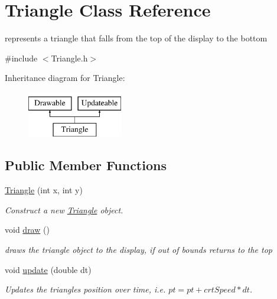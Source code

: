 \hypertarget{class_triangle}{}\section{Triangle Class Reference}
\label{class_triangle}


represents a triangle that falls from the top of the display to the bottom  




{\ttfamily \#include $<$Triangle.\+h$>$}

Inheritance diagram for Triangle\+:\begin{figure}[H]
\begin{center}
\leavevmode
\includegraphics[height=2.000000cm]{class_triangle}
\end{center}
\end{figure}
\subsection*{Public Member Functions}
\begin{DoxyCompactItemize}
\item 
\mbox{\hyperlink{class_triangle_afc6e6f7865d0dda26dd77682b2e29eeb}{Triangle}} (int x, int y)
\begin{DoxyCompactList}\small\item\em Construct a new \mbox{\hyperlink{class_triangle}{Triangle}} object. \end{DoxyCompactList}\item 
\mbox{\label{class_triangle_a43067ba4ee3c1d56930a567cc2186624}} 
void \mbox{\hyperlink{class_triangle_a43067ba4ee3c1d56930a567cc2186624}{draw}} ()
\begin{DoxyCompactList}\small\item\em draws the triangle object to the display, if out of bounds returns to the top \end{DoxyCompactList}\item 
void \mbox{\hyperlink{class_triangle_a38658aaef09315379d75dd9a36456c0e}{update}} (double dt)
\begin{DoxyCompactList}\small\item\em Updates the triangle\textquotesingle{}s position over time, i.\+e. $pt = pt + crtSpeed * dt$. \end{DoxyCompactList}\end{DoxyCompactItemize}


